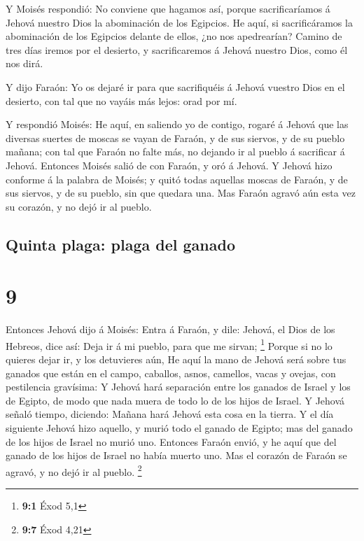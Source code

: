  Y Moisés respondió: No conviene que hagamos así, porque
sacrificaríamos á Jehová nuestro Dios la abominación de los Egipcios. He
aquí, si sacrificáramos la abominación de los Egipcios delante de ellos,
¿no nos apedrearían?  Camino de tres días iremos por el
desierto, y sacrificaremos á Jehová nuestro Dios, como él nos dirá.

 Y dijo Faraón: Yo os dejaré ir para que sacrifiquéis á
Jehová vuestro Dios en el desierto, con tal que no vayáis más lejos:
orad por mí.

 Y respondió Moisés: He aquí, en saliendo yo de contigo,
rogaré á Jehová que las diversas suertes de moscas se vayan de Faraón, y
de sus siervos, y de su pueblo mañana; con tal que Faraón no falte más,
no dejando ir al pueblo á sacrificar á Jehová.  Entonces
Moisés salió de con Faraón, y oró á Jehová.  Y Jehová
hizo conforme á la palabra de Moisés; y quitó todas aquellas moscas de
Faraón, y de sus siervos, y de su pueblo, sin que quedara una.
 Mas Faraón agravó aún esta vez su corazón, y no dejó ir
al pueblo.

\hypertarget{quinta-plaga-plaga-del-ganado}{%
\subsection{Quinta plaga: plaga del
ganado}\label{quinta-plaga-plaga-del-ganado}}

\hypertarget{section-8}{%
\section{9}\label{section-8}}

 Entonces Jehová dijo á Moisés: Entra á Faraón, y dile:
Jehová, el Dios de los Hebreos, dice así: Deja ir á mi pueblo, para que
me sirvan; \footnote{\textbf{9:1} Éxod 5,1}  Porque si no
lo quieres dejar ir, y los detuvieres aún,  He aquí la
mano de Jehová será sobre tus ganados que están en el campo, caballos,
asnos, camellos, vacas y ovejas, con pestilencia gravísima:
 Y Jehová hará separación entre los ganados de Israel y
los de Egipto, de modo que nada muera de todo lo de los hijos de Israel.
 Y Jehová señaló tiempo, diciendo: Mañana hará Jehová esta
cosa en la tierra.  Y el día siguiente Jehová hizo
aquello, y murió todo el ganado de Egipto; mas del ganado de los hijos
de Israel no murió uno.  Entonces Faraón envió, y he aquí
que del ganado de los hijos de Israel no había muerto uno. Mas el
corazón de Faraón se agravó, y no dejó ir al pueblo. \footnote{\textbf{9:7}
  Éxod 4,21}

